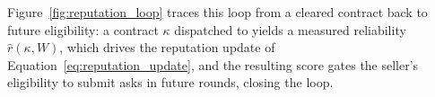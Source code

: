 Figure~\ref{fig:reputation_loop} traces this loop from a cleared contract
back to future eligibility: a contract $\kappa$ dispatched to
\NoesisServer{} yields a measured reliability $\hat r(\kappa, W)$, which
drives the reputation update of Equation~\eqref{eq:reputation_update}, and
the resulting score gates the seller's eligibility to submit asks in
future \NoesisMarket{} rounds, closing the loop.

% 
% 
% 
% 
% 
